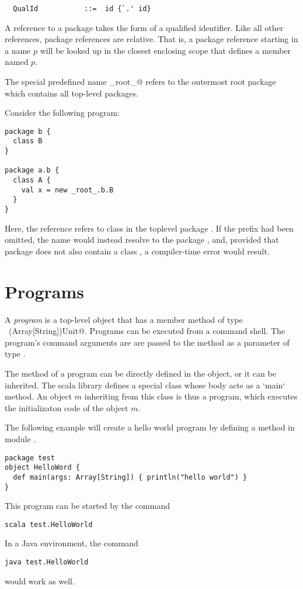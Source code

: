 \syntax\begin{lstlisting}
  QualId           ::=  id {`.' id}
\end{lstlisting}
A reference to a package takes the form of a qualified identifier.
Like all other references, package references are relative. That is, 
a package reference starting in a name $p$ will be looked up in the
closest enclosing scope that defines a member named $p$.

The special predefined name \lstinline@_root_@  refers to the
outermost root package which contains all top-level packages.  

\example\label{ex:package-ids}
Consider the following program:
\begin{lstlisting}
package b {
  class B 
}

package a.b {
  class A {
    val x = new _root_.b.B
  }
}
\end{lstlisting}  
Here, the reference  refers to class  in the
toplevel package . If the  prefix had been
omitted, the name  would instead resolve to the package
, and, provided that package does not also
contain a class , a compiler-time error would result.

\section{Programs}

A {\em program} is a top-level object that has a member method
 of type ~\lstinline@(Array[String])Unit@. Programs can be
executed from a command shell. The program's command arguments are are
passed to the  method as a parameter of type
.

The  method of a program can be directly defined in the
object, or it can be inherited. The scala library defines a special class
 whose body acts as a `main` method. 
An object $m$ inheriting from this class is thus a program, 
which executes the initializaton code of the object $m$.

\example The following example will create a hello world program by defining
a method  in module .
\begin{lstlisting}
package test
object HelloWord {
  def main(args: Array[String]) { println("hello world") }
}
\end{lstlisting}

This program can be started by the command
\begin{lstlisting}
scala test.HelloWorld
\end{lstlisting}
In a Java environment, the command
\begin{lstlisting}
java test.HelloWorld
\end{lstlisting}
would work as well. 

